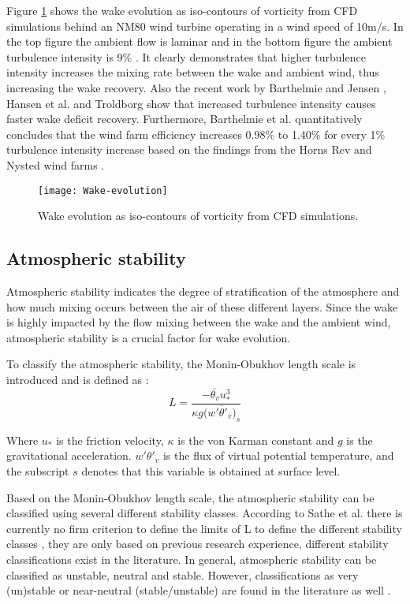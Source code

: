\documentclass{umthesis}
\begin{document}
Figure \ref{fig:Wake_evolution} \cite{Troldborg_ACL} shows the wake evolution as iso-contours of vorticity from CFD simulations behind an NM80 wind turbine operating in a wind speed of 10m/s. In the top figure the ambient flow is laminar and in the bottom figure the ambient turbulence intensity is 9\% \cite{Troldborg_ACL}. It clearly demonstrates that higher turbulence intensity increases the mixing rate between the wake and ambient wind, thus increasing the wake recovery. Also the recent work by Barthelmie and Jensen \cite{Barthelmie_Evaluation}, Hansen et al. \cite{TI_impact} and Troldborg \cite{Troldborg_ACL} show that increased turbulence intensity causes faster wake deficit recovery. Furthermore, Barthelmie et al. quantitatively concludes that the wind farm efficiency increases 0.98\% to 1.40\% for every 1\% turbulence intensity increase based on the findings from the Horns Rev and Nysted wind farms \cite{Meteorological_controls}.

\begin{figure}
  \centering
  \texttt{[image: Wake-evolution]}
  \caption{Wake evolution as iso-contours of vorticity from CFD simulations.}\label{fig:Wake_evolution}
\end{figure}


\subsection{Atmospheric stability}
Atmospheric stability indicates the degree of stratification of the atmosphere and how much mixing occurs between the air of these different layers. Since the wake is highly impacted by the flow mixing between the wake and the ambient wind, atmospheric stability is a crucial factor for wake evolution.

To classify the atmospheric stability, the Monin-Obukhov length scale is introduced and is defined as \cite{Stull}:
\begin{equation}
  L=\frac{-\overline{\theta_v}u_*^3}{\kappa g(\overline{w'\theta '_v)}_s }
\end{equation}

Where $u_*$ is the friction velocity, $\kappa$ is the von Karman constant and $g$ is the gravitational acceleration. $w'\theta '_v$ is the flux of virtual potential temperature, and the subscript $s$ denotes that this variable is obtained at surface level.

Based on the Monin-Obukhov length scale, the atmospheric stability can be classified using several different stability classes. According to Sathe et al. there is currently no firm criterion to define the limits of L to define the different stability classes \cite{Sathe}, they are only based on previous research experience, different stability classifications exist in the literature. In general, atmospheric stability can be classified as unstable, neutral and stable. However, classifications as very (un)stable or near-neutral (stable/unstable) are found in the literature as well \cite{Ten_years, Barthelmie_as, Sathe_sitedata, Sathe, Wharton_2, Wharton_1}.
\end{document}
